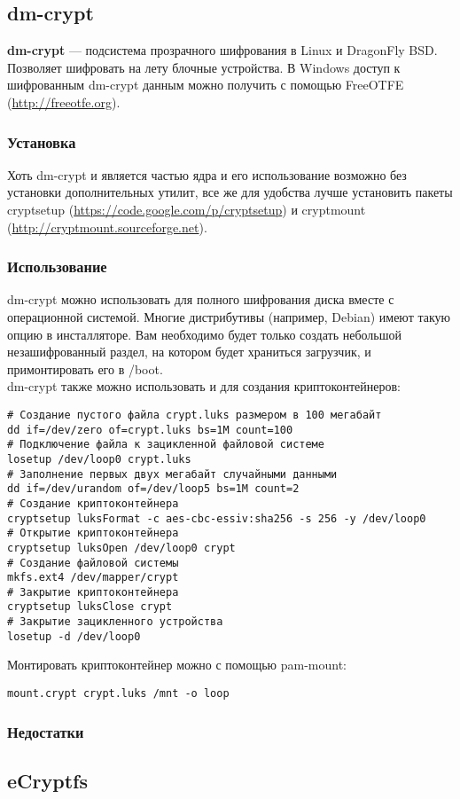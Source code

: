 \subsection{dm-crypt}
\textbf{dm-crypt} --- подсистема прозрачного шифрования в Linux и DragonFly BSD. Позволяет шифровать на лету блочные устройства. В Windows доступ к шифрованным dm-crypt данным можно получить с помощью FreeOTFE (\url{http://freeotfe.org}).
\subsubsection{Установка}
Хоть dm-crypt и является частью ядра и его использование возможно без установки дополнительных утилит, все же для удобства лучше установить пакеты cryptsetup (\url{https://code.google.com/p/cryptsetup}) и cryptmount (\url{http://cryptmount.sourceforge.net}).
\subsubsection{Использование}
dm-crypt можно использовать для полного шифрования диска вместе с операционной системой. Многие дистрибутивы (например, Debian) имеют такую опцию в инсталляторе. Вам необходимо будет только создать небольшой незашифрованный раздел, на котором будет храниться загрузчик, и примонтировать его в /boot.\\
dm-crypt также можно использовать и для создания криптоконтейнеров:
\begin{lstlisting}
# Создание пустого файла crypt.luks размером в 100 мегабайт
dd if=/dev/zero of=crypt.luks bs=1M count=100
# Подключение файла к зацикленной файловой системе
losetup /dev/loop0 crypt.luks
# Заполнение первых двух мегабайт случайными данными
dd if=/dev/urandom of=/dev/loop5 bs=1M count=2
# Создание криптоконтейнера
cryptsetup luksFormat -c aes-cbc-essiv:sha256 -s 256 -y /dev/loop0
# Открытие криптоконтейнера
cryptsetup luksOpen /dev/loop0 crypt
# Создание файловой системы
mkfs.ext4 /dev/mapper/crypt
# Закрытие криптоконтейнера
cryptsetup luksClose crypt
# Закрытие зацикленного устройства
losetup -d /dev/loop0
\end{lstlisting}
Монтировать криптоконтейнер можно с помощью pam-mount:
\begin{lstlisting}
mount.crypt crypt.luks /mnt -o loop
\end{lstlisting}
\subsubsection{Недостатки}
\subsection{eCryptfs}
